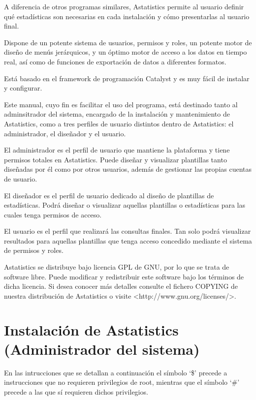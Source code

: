 \documentclass[spanish,12pt]{book}
\begin{document}
A diferencia de otros programas similares, Astatistics permite al usuario definir qué estadísticas son necesarias en cada instalación y cómo presentarlas al usuario final.

Dispone de un potente sistema de usuarios, permisos y roles, un potente motor de diseño de menús jerárquicos, y un óptimo motor de acceso a los datos en tiempo real, así como de funciones de exportación de datos a diferentes formatos.

Está basado en el framework de programación Catalyst y es muy fácil de instalar y configurar.

Este manual, cuyo fin es facilitar el uso del programa, está destinado tanto al adminsitrador del sistema, encargado de la instalación y mantenimiento de Astatistics, como a tres perfiles de usuario distintos dentro de Astatistics: el administrador, el diseñador y el usuario.

El administrador es el perfil de usuario que mantiene la plataforma y tiene permisos totales en Astatistics. Puede diseñar y visualizar plantillas tanto diseñadas por él como por otros usuarios, además de gestionar las propias cuentas de usuario.

El diseñador es el perfil de usuario dedicado al diseño de plantillas de estadísticas. Podrá diseñar o visualizar aquellas plantillas o estadísticas para las cuales tenga permisos de acceso.

El usuario es el perfil que realizará las consultas finales. Tan solo podrá visualizar resultados para aquellas plantillas que tenga acceso concedido mediante el sistema de permisos y roles.

Astatistics se distribuye bajo licencia GPL de GNU, por lo que se trata de software libre. Puede modificar y redistribuir este software bajo los términos de dicha licencia. Si desea conocer más detalles consulte el fichero COPYING de nuestra distribución de Astatistics o visite {\textless}http://www.gnu.org/licenses/\textgreater.

\chapter{Instalación de Astatistics (Administrador del sistema)}
En las intrucciones que se detallan a continuación el símbolo `\$' precede a instrucciones que no requieren privilegios de root, mientras que el símbolo `\#' precede a las que sí requieren dichos privilegios.
\end{document}
